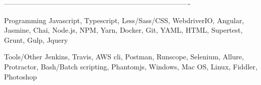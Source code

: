 -------------------------------------------------------------------------------


\begin{cvskills}

  \cvskill
    {Programming} %
    {Javascript, Typescript, Less/Sass/CSS, WebdriverIO, Angular, Jasmine, Chai, Node.js, NPM, Yarn, Docker, Git, YAML, HTML, Supertest, Grunt, Gulp, Jquery} %

  \cvskill
    {Tools/Other} %
    {Jenkins, Travis, AWS cli, Postman, Runscope, Selenium, Allure, Protractor, Bash/Batch scripting, Phantomjs, Windows, Mac OS, Linux, Fiddler, Photoshop} %

\end{cvskills}
